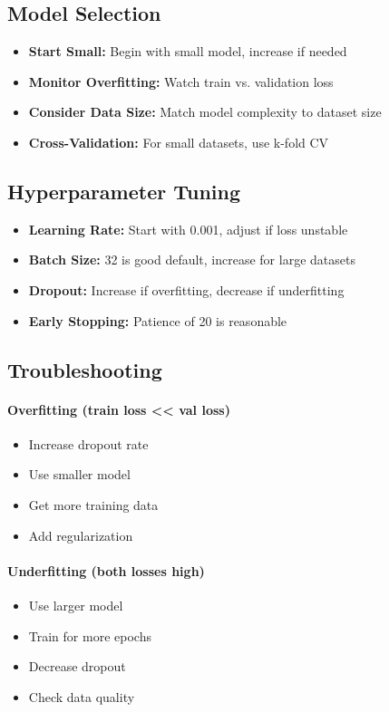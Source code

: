 \documentclass[11pt,a4paper]{article}
\begin{document}
\subsection{Model Selection}

\begin{itemize}
    \item \textbf{Start Small:} Begin with small model, increase if needed
    \item \textbf{Monitor Overfitting:} Watch train vs. validation loss
    \item \textbf{Consider Data Size:} Match model complexity to dataset size
    \item \textbf{Cross-Validation:} For small datasets, use k-fold CV
\end{itemize}

\subsection{Hyperparameter Tuning}

\begin{itemize}
    \item \textbf{Learning Rate:} Start with 0.001, adjust if loss unstable
    \item \textbf{Batch Size:} 32 is good default, increase for large datasets
    \item \textbf{Dropout:} Increase if overfitting, decrease if underfitting
    \item \textbf{Early Stopping:} Patience of 20 is reasonable
\end{itemize}

\subsection{Troubleshooting}

\paragraph{Overfitting (train loss << val loss)}
\begin{itemize}
    \item Increase dropout rate
    \item Use smaller model
    \item Get more training data
    \item Add regularization
\end{itemize}

\paragraph{Underfitting (both losses high)}
\begin{itemize}
    \item Use larger model
    \item Train for more epochs
    \item Decrease dropout
    \item Check data quality
\end{itemize}
\end{document}
